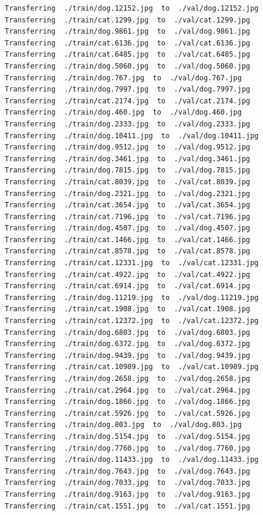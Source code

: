 \documentclass[]{book}
\theoremstyle{definition}
\theoremstyle{definition}
\theoremstyle{definition}
\theoremstyle{remark}
\begin{document}
\begin{verbatim}
Transferring  ./train/dog.12152.jpg  to  ./val/dog.12152.jpg
Transferring  ./train/cat.1299.jpg  to  ./val/cat.1299.jpg
Transferring  ./train/dog.9861.jpg  to  ./val/dog.9861.jpg
Transferring  ./train/cat.6136.jpg  to  ./val/cat.6136.jpg
Transferring  ./train/cat.6485.jpg  to  ./val/cat.6485.jpg
Transferring  ./train/dog.5060.jpg  to  ./val/dog.5060.jpg
Transferring  ./train/dog.767.jpg  to  ./val/dog.767.jpg
Transferring  ./train/dog.7997.jpg  to  ./val/dog.7997.jpg
Transferring  ./train/cat.2174.jpg  to  ./val/cat.2174.jpg
Transferring  ./train/dog.460.jpg  to  ./val/dog.460.jpg
Transferring  ./train/dog.2333.jpg  to  ./val/dog.2333.jpg
Transferring  ./train/dog.10411.jpg  to  ./val/dog.10411.jpg
Transferring  ./train/dog.9512.jpg  to  ./val/dog.9512.jpg
Transferring  ./train/dog.3461.jpg  to  ./val/dog.3461.jpg
Transferring  ./train/dog.7815.jpg  to  ./val/dog.7815.jpg
Transferring  ./train/cat.8039.jpg  to  ./val/cat.8039.jpg
Transferring  ./train/dog.2321.jpg  to  ./val/dog.2321.jpg
Transferring  ./train/cat.3654.jpg  to  ./val/cat.3654.jpg
Transferring  ./train/cat.7196.jpg  to  ./val/cat.7196.jpg
Transferring  ./train/dog.4507.jpg  to  ./val/dog.4507.jpg
Transferring  ./train/cat.1466.jpg  to  ./val/cat.1466.jpg
Transferring  ./train/cat.8578.jpg  to  ./val/cat.8578.jpg
Transferring  ./train/cat.12331.jpg  to  ./val/cat.12331.jpg
Transferring  ./train/cat.4922.jpg  to  ./val/cat.4922.jpg
Transferring  ./train/cat.6914.jpg  to  ./val/cat.6914.jpg
Transferring  ./train/dog.11219.jpg  to  ./val/dog.11219.jpg
Transferring  ./train/cat.1908.jpg  to  ./val/cat.1908.jpg
Transferring  ./train/cat.12372.jpg  to  ./val/cat.12372.jpg
Transferring  ./train/dog.6803.jpg  to  ./val/dog.6803.jpg
Transferring  ./train/dog.6372.jpg  to  ./val/dog.6372.jpg
Transferring  ./train/dog.9439.jpg  to  ./val/dog.9439.jpg
Transferring  ./train/cat.10989.jpg  to  ./val/cat.10989.jpg
Transferring  ./train/dog.2658.jpg  to  ./val/dog.2658.jpg
Transferring  ./train/cat.2964.jpg  to  ./val/cat.2964.jpg
Transferring  ./train/dog.1866.jpg  to  ./val/dog.1866.jpg
Transferring  ./train/cat.5926.jpg  to  ./val/cat.5926.jpg
Transferring  ./train/dog.803.jpg  to  ./val/dog.803.jpg
Transferring  ./train/dog.5154.jpg  to  ./val/dog.5154.jpg
Transferring  ./train/dog.7760.jpg  to  ./val/dog.7760.jpg
Transferring  ./train/dog.11433.jpg  to  ./val/dog.11433.jpg
Transferring  ./train/dog.7643.jpg  to  ./val/dog.7643.jpg
Transferring  ./train/dog.7033.jpg  to  ./val/dog.7033.jpg
Transferring  ./train/dog.9163.jpg  to  ./val/dog.9163.jpg
Transferring  ./train/cat.1551.jpg  to  ./val/cat.1551.jpg

\end{verbatim}
\end{document}
